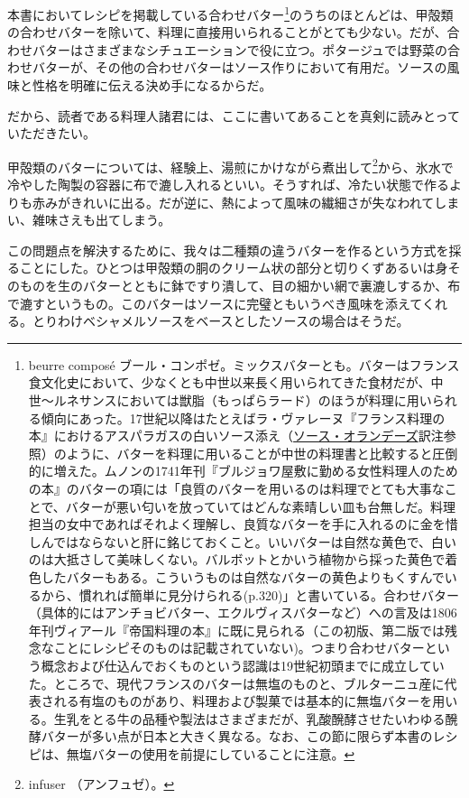 本書においてレシピを掲載している合わせバター\footnote{beurre composé
  ブール・コンポゼ。ミックスバターとも。バターはフランス食文化史において、少なくとも中世以来長く用いられてきた食材だが、中世〜ルネサンスにおいては獣脂（もっぱらラード）のほうが料理に用いられる傾向にあった。17世紀以降はたとえばラ・ヴァレーヌ『フランス料理の本』におけるアスパラガスの白いソース添え（\protect\hyperlink{sauce-hollandaise}{ソース・オランデーズ}訳注参照）のように、バターを料理に用いることが中世の料理書と比較すると圧倒的に増えた。ムノンの1741年刊『ブルジョワ屋敷に勤める女性料理人のための本』のバターの項には「良質のバターを用いるのは料理でとても大事なことで、バターが悪い匂いを放っていてはどんな素晴しい皿も台無しだ。料理担当の女中であればそれよく理解し、良質なバターを手に入れるのに金を惜しんではならないと肝に銘じておくこと。いいバターは自然な黄色で、白いのは大抵さして美味しくない。バルボットとかいう植物から採った黄色で着色したバターもある。こういうものは自然なバターの黄色よりもくすんでいるから、慣れれば簡単に見分けられる(p.320)」と書いている。合わせバター（具体的にはアンチョビバター、エクルヴィスバターなど）への言及は1806年刊ヴィアール『帝国料理の本』に既に見られる（この初版、第二版では残念なことにレシピそのものは記載されていない)。つまり合わせバターという概念および仕込んでおくものという認識は19世紀初頭までに成立していた。ところで、現代フランスのバターは無塩のものと、ブルターニュ産に代表される有塩のものがあり、料理および製菓では基本的に無塩バターを用いる。生乳をとる牛の品種や製法はさまざまだが、乳酸醗酵させたいわゆる醗酵バターが多い点が日本と大きく異なる。なお、この節に限らず本書のレシピは、無塩バターの使用を前提にしていることに注意。}のうちのほとんどは、甲殻類の合わせバターを除いて、料理に直接用いられることがとても少ない。だが、合わせバターはさまざまなシチュエーションで役に立つ。ポタージュでは野菜の合わせバターが、その他の合わせバターはソース作りにおいて有用だ。ソースの風味と性格を明確に伝える決め手になるからだ。

だから、読者である料理人諸君には、ここに書いてあることを真剣に読みとっていただきたい。

甲殻類のバターについては、経験上、湯煎にかけながら煮出して\footnote{infuser
  （アンフュゼ）。}から、氷水で冷やした陶製の容器に布で漉し入れるといい。そうすれば、冷たい状態で作るよりも赤みがきれいに出る。だが逆に、熱によって風味の繊細さが失なわれてしまい、雑味さえも出てしまう。

この問題点を解決するために、我々は二種類の違うバターを作るという方式を採ることにした。ひとつは甲殻類の胴のクリーム状の部分と切りくずあるいは身そのものを生のバターとともに鉢ですり潰して、目の細かい網で裏漉しするか、布で漉すというもの。このバターはソースに完璧ともいうべき風味を添えてくれる。とりわけベシャメルソースをベースとしたソースの場合はそうだ。


